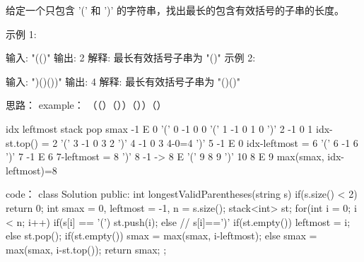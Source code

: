 给定一个只包含 '(' 和 ')' 的字符串，找出最长的包含有效括号的子串的长度。

示例 1:

输入: "(()"
输出: 2
解释: 最长有效括号子串为 "()"
示例 2:

输入: ")()())"
输出: 4
解释: 最长有效括号子串为 "()()"
























思路：
example： 			（（）（））（））（）

		idx		leftmost		stack		pop			smax
				-1			E 					0
'('		0		-1			0					0
'('		1		-1			0 1					0
')'		2		-1			0		1			idx-st.top() = 2
'('		3		-1			0 3					2
')'		4		-1			0		3			4-0=4
')'		5		-1			E 		0			idx-leftmost = 6
'('		6		-1			6		
')'		7		-1			E 		6			7-leftmost = 8
')'		8	   -1 -> 8			E 					
'('		9		8			9					
')'		10		8 			E 		9			max(smax, idx-leftmost)=8

















code：
class Solution {
public:
    int longestValidParentheses(string s) {
        if(s.size() < 2) return 0;
        int smax = 0, leftmost = -1, n = s.size();
        stack<int> st;
        for(int i = 0; i < n; i++)
        {
            if(s[i] == '(') st.push(i);
            else   // s[i]==')'
            {
                if(st.empty()) leftmost = i;
                else
                {
                    st.pop();
                    if(st.empty()) smax = max(smax, i-leftmost);
                    else smax = max(smax, i-st.top());
                }
            }
        }
        return smax;
    }
};